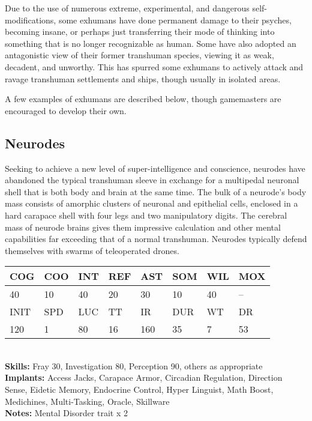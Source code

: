 Due to the use of numerous extreme, experimental, and dangerous self-modifications, some exhumans have done permanent damage to their psyches, becoming insane, or perhaps just transferring their mode of thinking into something that is no longer recognizable as human. Some have also adopted an antagonistic view of their former transhuman species, viewing it as weak, decadent, and unworthy. This has spurred some exhumans to actively attack and ravage transhuman settlements and ships, though usually in isolated areas. 

A few examples of exhumans are described below, though gamemasters are encouraged to develop their own. 

\subsection{Neurodes} 

Seeking to achieve a new level of super-intelligence and conscience, neurodes have abandoned the typical transhuman sleeve in exchange for a multipedal neuronal shell that is both body and brain at the same time. The bulk of a neurode's body mass consists of amorphic clusters of neuronal and epithelial cells, enclosed in a hard carapace shell with four legs and two manipulatory digits. The cerebral mass of neurode brains gives them impressive calculation and other mental capabilities far exceeding that of a normal transhuman. Neurodes typically defend themselves with swarms of teleoperated drones. 

\begin{tabular}{|l|l|l|l|l|l|l|l|} \hline

COG &COO &INT &REF &AST &SOM &WIL &MOX \\ \hline

40 &10 &40 &20 &30 &10 &40 &-- \\ \hline

INIT &SPD &LUC &TT &IR &DUR &WT &DR \\ \hline

120 &1 &80 &16 &160 &35 &7 &53 \\ \hline

\end{tabular} \\ \textbf{Skills:} Fray 30, Investigation 80, Perception 90, others as appropriate \\ \textbf{Implants:} Access Jacks, Carapace Armor, Circadian Regulation, Direction Sense, Eidetic Memory, Endocrine Control, Hyper Linguist, Math Boost, Medichines, Multi-Tasking, Oracle, Skillware \\ \textbf{Notes:} Mental Disorder trait x 2 \\ 

